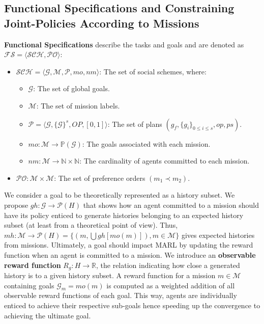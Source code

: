 \documentclass[conference]{IEEEtran}
\newcounter{relation}
\begin{document}
\subsection{Functional Specifications and Constraining Joint-Policies According to Missions}

\textbf{Functional Specifications} describe the tasks and goals and are denoted as $\mathcal{FS} = \langle \mathcal{SCH}, \mathcal{PO} \rangle$:

\begin{itemize}
    \item $\mathcal{SCH} = \langle \mathcal{G}, \mathcal{M}, \mathcal{P}, mo, nm \rangle$: The set of social schemes, where:
          \begin{itemize}
              \item $\mathcal{G}$: The set of global goals.
              \item $\mathcal{M}$: The set of mission labels.
              \item $\mathcal{P} = \langle \mathcal{G}, \{\mathcal{G}\}^s, OP, [0,1] \rangle$: The set of plans $(g_f, \{g_i\}_{0 \leq i \leq s}, op, ps)$.
              \item $mo: \mathcal{M} \rightarrow \mathbb{P}(\mathcal{G})$: The goals associated with each mission.
              \item $nm: \mathcal{M} \rightarrow \mathbb{N} \times \mathbb{N}$: The cardinality of agents committed to each mission.
          \end{itemize}
    \item $\mathcal{PO}: \mathcal{M} \times \mathcal{M}$: The set of preference orders $(m_1 \prec m_2)$.
\end{itemize}

We consider a goal to be theoretically represented as a history subset. We propose $gh: \mathcal{G} \rightarrow \mathcal{P}(H)$ that shows how an agent committed to a mission should have its policy enticed to generate histories belonging to an expected history subset (at least from a theoretical point of view). Thus, $mh: \mathcal{M} \rightarrow \mathcal{P}(H) = \{(m,\bigcup gh[mo(m)]), m \in \mathcal{M}\}$ gives expected histories from missions. Ultimately, a goal should impact MARL by updating the reward function when an agent is committed to a mission. We introduce an \textbf{observable reward function} $R_{g}: H \rightarrow \mathbb{R}$, the relation indicating how close a generated history is to a given history subset. A reward function for a mission $m \in \mathcal{M}$ containing goals $\mathcal{G}_{m} = mo(m)$ is computed as a weighted addition of all observable reward functions of each goal. This way, agents are individually enticed to achieve their respective sub-goals hence speeding up the convergence to achieving the ultimate goal.
\end{document}

